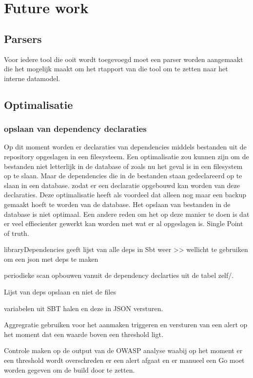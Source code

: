 
\chapter{Future work}\label{ch:name} %


\section{Parsers}\label{sec:parsers}
Voor iedere tool die ooit wordt toegevoegd moet een parser worden aangemaakt die het mogelijk maakt om het rtapport van die tool om te zetten naar het interne datamodel.




\section{Optimalisatie}

\subsection{opslaan van dependency declaraties}
Op dit moment worden er declaraties van dependencies middels bestanden uit de repository opgeslagen in een filesysteem. Een optimalisatie zou kunnen zijn om de bestanden niet letterlijk in de database of zoals nu het geval is in een filesystem op te slaan. Maar de dependencies die in de bestanden staan gedeclareerd op te slaan in een database. zodat er een declaratie opgebouwd kan worden van deze declaraties. Deze optimalisatie heeft als voordeel dat alleen nog maar een backup gemaakt hoeft te worden van de database. Het opslaan van bestanden in de database is niet optimaal. Een andere reden om het op deze manier te doen is dat er veel effiecienter gewerkt kan worden met wat er al opgeslagen is. Single Point of truth.



libraryDependencies geeft lijst van alle deps in Sbt weer >> wellicht te gebruiken om een json met deps te maken


periodieke scan opbouwen vanuit de dependency declarties uit de tabel zelf/.

Lijst van deps opslaan en niet de files

variabelen uit SBT halen en deze in JSON versturen.

Aggregratie gebruiken voor het aanmaken triggeren en versturen van een alert op het moment dat een waarde boven een threshold ligt.

Controle maken op de output van de OWASP analyse waabij op het moment er een threshold wordt overschreden er een alert afgaat en er manueel een Go moet worden gegeven om de build door te zetten.

